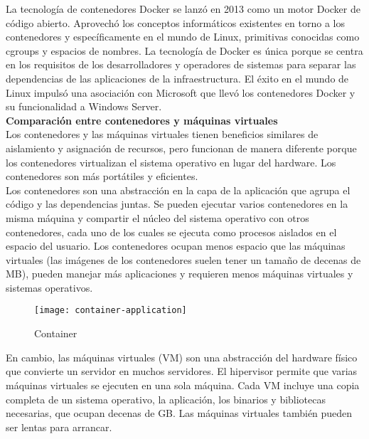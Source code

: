 \documentclass[ spanish, a4paper, 12pt, oneside]{report}
\begin{document}
La tecnología de contenedores Docker se lanzó en 2013 como un motor Docker de código abierto. Aprovechó los conceptos 
informáticos existentes en torno a los contenedores y específicamente en el mundo de Linux, primitivas conocidas como 
cgroups y espacios de nombres. La tecnología de Docker es única porque se centra en los requisitos de los desarrolladores 
y operadores de sistemas para separar las dependencias de las aplicaciones de la infraestructura.
El éxito en el mundo de Linux impulsó una asociación con Microsoft que llevó los contenedores Docker y su funcionalidad 
a Windows Server.\\

\textbf{Comparación entre contenedores y máquinas virtuales}\\
Los contenedores y las máquinas virtuales tienen beneficios similares de aislamiento y asignación de recursos, pero 
funcionan de manera diferente porque los contenedores virtualizan el sistema operativo en lugar del hardware. 
Los contenedores son más portátiles y eficientes.\\

Los contenedores son una abstracción en la capa de la aplicación que agrupa el código y las dependencias juntas. 
Se pueden ejecutar varios contenedores en la misma máquina y compartir el núcleo del sistema operativo con otros 
contenedores, cada uno de los cuales se ejecuta como procesos aislados en el espacio del usuario. Los contenedores ocupan 
menos espacio que las máquinas virtuales (las imágenes de los contenedores suelen tener un tamaño de decenas de MB), 
pueden manejar más aplicaciones y requieren menos máquinas virtuales y sistemas operativos.\\

\begin{figure}[!h]
   \centering
   \texttt{[image: container-application]}\\
      \caption{\label{fig: container} Container}
\end{figure}


En cambio, las máquinas virtuales (VM) son una abstracción del hardware físico que convierte un servidor en muchos 
servidores. El hipervisor permite que varias máquinas virtuales se ejecuten en una sola máquina. Cada VM incluye una 
copia completa de un sistema operativo, la aplicación, los binarios y bibliotecas necesarias, que ocupan decenas de GB. 
Las máquinas virtuales también pueden ser lentas para arrancar.\\
\end{document}
